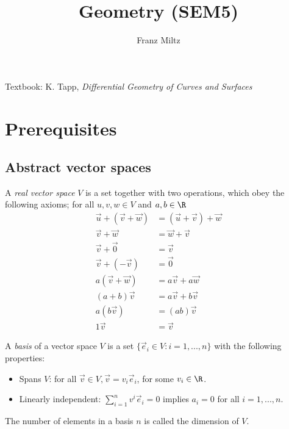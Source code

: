 \documentclass{article}
\begin{document}
\title{Geometry (SEM5)}
\author{Franz Miltz}
\maketitle
\noindent Textbook: K. Tapp, \emph{Differential Geometry of Curves and Surfaces}
\tableofcontents
\pagebreak

\section{Prerequisites}

\subsection{Abstract vector spaces}

\begin{definition}[Notes 2.1]
    A \emph{real vector space} $V$ is a set together with two operations, which obey the following
    axioms; for all $u,v,w\in V$ and $a,b\in\R$
    \begin{align*}
        \vec u + (\vec v + \vec w) &= (\vec u + \vec v) + \vec w\\
        \vec v + \vec w &= \vec w + \vec v \\
        \vec v + \vec 0 &= \vec v \\
        \vec v + (-\vec v) &= \vec 0 \\
        a(\vec v + \vec w) &= a\vec v + a\vec w \\
        (a+b)\vec v &= a\vec v + b\vec v \\
        a(b\vec v) &= (ab)\vec v\\
        1\vec v &= \vec v
    \end{align*}
\end{definition}

\begin{definition}[Notes 2.3]
    A \emph{basis} of a vector space $V$ is a set $\{\vec e_i \in V : i = 1, ..., n\}$
    with the following properties:
    \begin{itemize}
        \item Spans $V$: for all $\vec v\in V, \vec v = v_i \vec e_i$, for some $v_i\in\R$.
        \item Linearly independent: $\sum_{i=1}^n v^i\vec e_i = 0$ implies $a_i = 0$ for all $i=1,...,n$.
    \end{itemize}
    The number of elements in a basis $n$ is called the dimension of $V$.
\end{definition}
\end{document}
